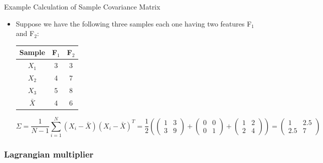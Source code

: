 \documentclass[serif, aspectratio=169]{beamer}
\begin{document}
\begin{frame}{Example Calculation of Sample Covariance Matrix}
    \begin{itemize}         
        \item Suppose we have the following three samples each one having two features F$_1$ and F$_2$:
\begin{center}
     \begin{tabular}{|c|c|c|}
        \hline
        \textbf{Sample} & \textbf{F$_1$} & \textbf{F$_2$} \\
        \hline
        $X_1$ & 3 & 3 \\
        \hline
        $X_2$ & 4 & 7 \\
        \hline
        $X_3$ & 5 & 8 \\
        \hline
        $\bar{X}$ & 4 & 6 \\
        \hline
        \end{tabular}
\end{center}
     
     $$\Sigma =  \frac{1}{N-1} \sum_{i=1}^{N} (X_i - \bar{X})(X_i - \bar{X})^T =  \frac{1}{2} (\begin{pmatrix}
1 & 3  \\
3 & 9 
\end{pmatrix}  + \begin{pmatrix}
0 & 0  \\
0 & 1 
\end{pmatrix} + \begin{pmatrix}
1 & 2  \\
2 & 4 
\end{pmatrix}) =  \begin{pmatrix}
1 & 2.5  \\
2.5 & 7 
\end{pmatrix} $$
    \end{itemize}
\end{frame}

\subsubsection{Lagrangian multiplier}
\end{document}
